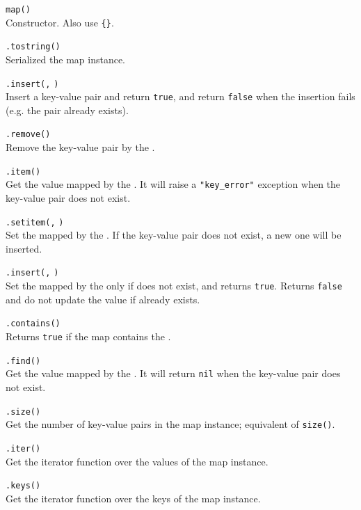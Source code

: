 \hangpar \texttt{map()}\\
Constructor. Also use \texttt{\{\}}.

\hangpar {}\texttt{.tostring()}\\
Serialized the map instance.

\hangpar {}\texttt{.insert(}\texttt{,} \texttt{)}\\
Insert a key-value pair and return \texttt{true}, and return \texttt{false} when the insertion fails (e.g. the pair already exists).

\hangpar {}\texttt{.remove(}\texttt{)}\\
Remove the key-value pair by the .

\hangpar {}\texttt{.item(}\texttt{)}\\
Get the value mapped by the . It will raise a \texttt{"key\_error"} exception when the key-value pair does not exist.

\hangpar {}\texttt{.setitem(}\texttt{,} \texttt{)}\\
Set the  mapped by the . If the key-value pair does not exist, a new one will be inserted.

\hangpar {}\texttt{.insert(}\texttt{,} \texttt{)}\\
Set the  mapped by the  only if  does not exist, and returns \texttt{true}. Returns \texttt{false} and do not update the value if  already exists.

\hangpar {}\texttt{.contains(}\texttt{)}\\
Returns \texttt{true} if the map contains the .

\hangpar {}\texttt{.find(}\texttt{)}\\
Get the value mapped by the . It will return \texttt{nil} when the key-value pair does not exist.

\hangpar {}\texttt{.size()}\\
Get the number of key-value pairs in the map instance; equivalent of \texttt{size(}\texttt{)}.

\hangpar {}\texttt{.iter()}\\
Get the iterator function over the values of the map instance. 

\hangpar {}\texttt{.keys()}\\
Get the iterator function over the keys of the map instance. 

